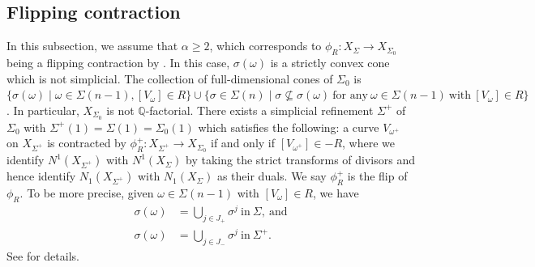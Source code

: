 \documentclass[12pt,reqno]{amsart}
\theoremstyle{definition}
\newcommand{\mb}{\mathbb}
\begin{document}
\subsection{Flipping contraction}
In this subsection, we assume that $\alpha\geq 2$, which corresponds to $\phi_R\colon X_\Sigma\to X_{\Sigma_0}$ being a flipping contraction by \cite[Corollary 14-2-2]{matsuki2002mmp}. In this case, $\sigma(\omega)$ is a strictly convex cone which is not simplicial. 
The collection of full-dimensional cones of $\Sigma_0$ is $\{\sigma(\omega)\mid \omega\in\Sigma(n-1),[V_\omega]\in R\}\cup\{\sigma\in\Sigma(n)
\mid \sigma\nsubseteq\sigma(\omega)\ \text{for any}\ \omega\in\Sigma(n-1)\ \text{with}\ [V_\omega]\in R\}$. In particular, $X_{\Sigma_0}$ is not $\mb Q$-factorial. There exists a simplicial refinement $\Sigma^+$ of $\Sigma_0$ with $\Sigma^+(1)=\Sigma(1)=\Sigma_0(1)$ which satisfies the following: a curve $V_{\omega^+}$ on $X_{\Sigma^+}$ is contracted by $\phi_R^+\colon X_{\Sigma^+}\rightarrow X_{\Sigma_0}$ if and only if $[V_{\omega^+}]\in -R$,
where we identify $N^1(X_{\Sigma^+})$ with $N^1(X_{\Sigma})$ by taking the strict transforms
of divisors and hence identify $N_1(X_{\Sigma^+})$ with $N_1(X_{\Sigma})$ as their duals.
We say $\phi_R^+$ is the flip of $\phi_R$. To be more precise, given $\omega\in\Sigma(n-1)$ with $[V_\omega]\in R$, we have
\begin{align*}
\sigma(\omega)&=\bigcup_{j\in J_+}\sigma^j\ \text{in}\ \Sigma,\ \text{and}\\
\sigma(\omega)&=\bigcup_{j\in J_-}\sigma^j\ \text{in}\ \Sigma^+.
\end{align*} 
See \cite[Corollary 14-2-2(iii), Proposition 14-2-4 and its proof]{matsuki2002mmp} for details.
\end{document}
